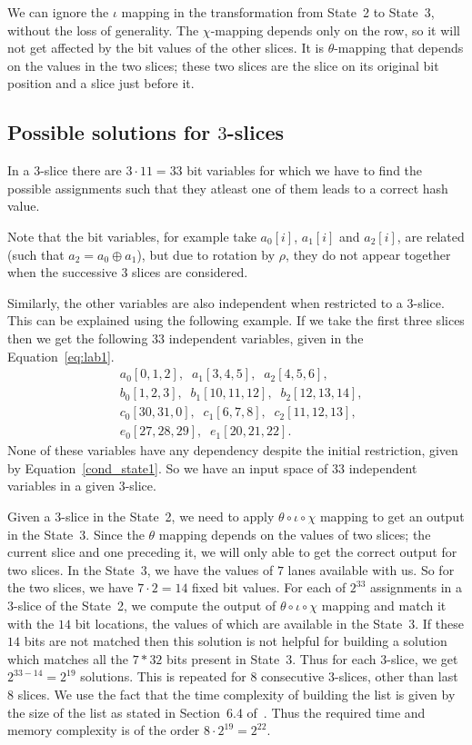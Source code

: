 We can ignore the $\iota$ mapping in the transformation from State~2 to State~3, without the loss of generality. The $\chi$-mapping depends only on the row, so it will not get affected by the bit values of the other slices. It is $\theta$-mapping that depends on the values in the two slices; these two slices are the slice on its original bit position and a slice just before it.

\subsection{Possible solutions for $3$-slices} 
In a $3$-slice there are $3 \cdot 11 = 33$ bit variables for which we have to find the possible assignments such that they atleast one of them leads to a correct hash value. 

Note that the bit variables, for example take $a_0[i]$, $a_1[i]$ and $a_2[i]$, are related (such that $a_2 = a_0 \oplus a_1$), but due to rotation by $\rho$, they do not appear together when the successive $3$ slices are considered.

Similarly, the other variables are also independent when restricted to a $3$-slice.
This can be explained using the following example. If we take the first three slices then we get the following $33$ independent variables, given in the Equation~\ref{eq:lab1}.
\begin{equation}
\label{eq:lab1}
\begin{aligned}
&a_0[0,1,2],\;\;a_1[3,4,5],\;\;a_2[4,5,6],\\
&b_0[1,2,3],\;\; b_1[10,11,12],\;\;b_2[12,13,14],\\
&c_0[30,31,0],\;\;c_1[6,7,8],\;\;c_2[11,12,13],\\
&e_0[27,28,29],\;\; e_1[20,21,22].
\end{aligned}
\end{equation}
None of these variables have any dependency despite the initial restriction, given by Equation~\ref{cond_state1}. So we have an input space of $33$ independent variables in a given $3$-slice. 

Given a $3$-slice in the State~2, we need to apply $\theta \circ \iota \circ \chi$ mapping to get an output in the State~3. Since the $\theta$ mapping depends on the values of two slices; the current slice and one preceding it, we will only able to get the correct output for two slices. In the State~3, we have the values of $7$ lanes available with us. So for the two slices, we have $7\cdot 2 = 14$ fixed bit values.
For each of $2^{33}$ assignments in a $3$-slice of the State~2, we compute the output of $\theta \circ \iota \circ \chi$ mapping and match it with the $14$ bit locations, the values of which are available in the State~3. If these $14$ bits are not matched then this solution is not helpful for building a solution which matches all the $7*32$ bits present in State~3.
Thus for each $3$-slice, we get $2^{33-14} = 2^{19}$ solutions. This is repeated for $8$ consecutive $3$-slices, other than last $8$ slices. We use the fact that the time complexity of building the list is given by the size of the list as stated in Section~6.4 of~\cite{naya2011practical}. Thus the required time and memory complexity is of the order $8 \cdot 2^{19} = 2^{22}$.

